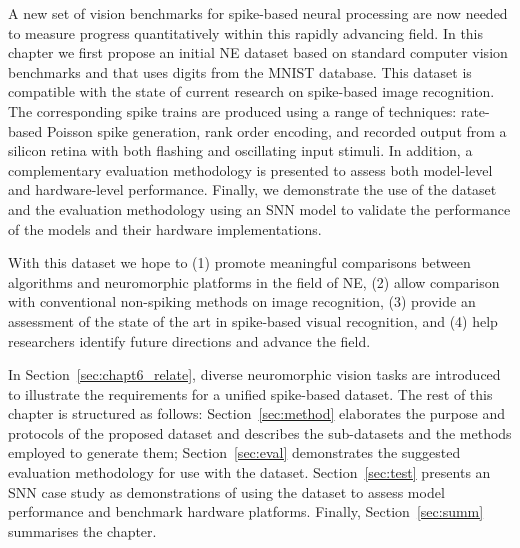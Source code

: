 A new set of vision benchmarks for spike-based neural processing are now needed to measure progress quantitatively within this rapidly advancing field.
%
In this chapter we first propose an initial NE dataset based on standard computer vision benchmarks and that uses digits from the MNIST database.
This dataset is compatible with the state of current research on spike-based image recognition.
The corresponding spike trains are produced using a range of techniques: rate-based Poisson spike generation, rank order encoding, and recorded output from a silicon retina with both flashing and oscillating input stimuli.
In addition, a complementary evaluation methodology is presented to assess both model-level and hardware-level performance.
Finally, we demonstrate the use of the dataset and the evaluation methodology using an SNN model to validate the performance of the models and their hardware implementations.

With this dataset we hope to (1) promote meaningful comparisons between algorithms and neuromorphic platforms in the field of NE, (2) allow comparison with conventional non-spiking methods on image recognition, (3) provide an assessment of the state of the art in spike-based visual recognition, and (4) help researchers identify future directions and advance the field.

In Section~\ref{sec:chapt6_relate}, diverse neuromorphic vision tasks are introduced to illustrate the requirements for a unified spike-based dataset.
The rest of this chapter is structured as follows: Section~\ref{sec:method} elaborates the purpose and protocols of the proposed dataset and describes the sub-datasets and the methods employed to generate them; Section~\ref{sec:eval} demonstrates the suggested evaluation methodology for use with the dataset.
Section~\ref{sec:test} presents an SNN case study as demonstrations of using the dataset to assess model performance and benchmark hardware platforms.
Finally, Section~\ref{sec:summ} summarises the chapter.


